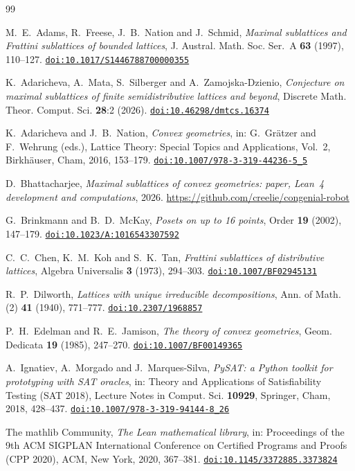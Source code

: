 \documentclass[11pt]{amsart}
\theoremstyle{definition}
\theoremstyle{remark}
\numberwithin{equation}{section}
\newcommand{\doi}[1]{\href{https://doi.org/#1}{\nolinkurl{doi:#1}}}
\begin{document}
\begin{thebibliography}{99}

M.~E.~Adams, R.~Freese, J.~B.~Nation and J.~Schmid, \emph{Maximal sublattices and Frattini sublattices of bounded lattices}, J. Austral. Math. Soc. Ser.~A \textbf{63} (1997), 110--127. \doi{10.1017/S1446788700000355}

K.~Adaricheva, A.~Mata, S.~Silberger and A.~Zamojska-Dzienio, \emph{Conjecture on maximal sublattices of finite semidistributive lattices and beyond}, Discrete Math. Theor. Comput. Sci. \textbf{28}:2 (2026). \doi{10.46298/dmtcs.16374}

K.~Adaricheva and J.~B.~Nation, \emph{Convex geometries}, in: G.~Gr\"atzer and F.~Wehrung (eds.), Lattice Theory: Special Topics and Applications, Vol.~2, Birkh\"auser, Cham, 2016, 153--179. \doi{10.1007/978-3-319-44236-5_5}

D.~Bhattacharjee, \emph{Maximal sublattices of convex geometries: paper, Lean~4 development and computations}, 2026. \url{https://github.com/creelie/congenial-robot}

G.~Brinkmann and B.~D.~McKay, \emph{Posets on up to 16 points}, Order \textbf{19} (2002), 147--179. \doi{10.1023/A:1016543307592}

C.~C.~Chen, K.~M.~Koh and S.~K.~Tan, \emph{Frattini sublattices of distributive lattices}, Algebra Universalis \textbf{3} (1973), 294--303. \doi{10.1007/BF02945131}

R.~P.~Dilworth, \emph{Lattices with unique irreducible decompositions}, Ann. of Math. (2) \textbf{41} (1940), 771--777. \doi{10.2307/1968857}

P.~H.~Edelman and R.~E.~Jamison, \emph{The theory of convex geometries}, Geom. Dedicata \textbf{19} (1985), 247--270. \doi{10.1007/BF00149365}

A.~Ignatiev, A.~Morgado and J.~Marques-Silva, \emph{PySAT: a Python toolkit for prototyping with SAT oracles}, in: Theory and Applications of Satisfiability Testing (SAT 2018), Lecture Notes in Comput. Sci. \textbf{10929}, Springer, Cham, 2018, 428--437. \doi{10.1007/978-3-319-94144-8_26}

The mathlib Community, \emph{The Lean mathematical library}, in: Proceedings of the 9th ACM SIGPLAN International Conference on Certified Programs and Proofs (CPP 2020), ACM, New York, 2020, 367--381. \doi{10.1145/3372885.3373824}


\end{thebibliography}
\end{document}
